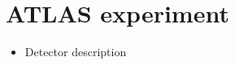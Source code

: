 \chapter{ATLAS experiment}
\label{sec:atlas}

\begin{itemize}
\item Detector description
\end{itemize}
